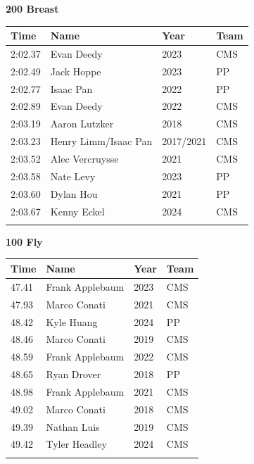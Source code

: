 \vspace{1.2em}
\noindent\begin{minipage}[t]{0.98\textwidth}
\centering
\textbf{\textcolor{teamprimary}{200 Breast}}\par
\vspace{0.5em}
\centering
\small
\renewcommand{\arraystretch}{1.0}
\setlength{\tabcolsep}{4pt}
\begin{tabular}{@{}p{2.5cm}p{4.5cm}p{1.5cm}p{2.5cm}@{}}
\toprule
\textbf{Time} & \textbf{Name} & \textbf{Year} & \textbf{Team} \\
\midrule
2:02.37 & Evan Deedy & 2023 & CMS \\
2:02.49 & Jack Hoppe & 2023 & PP \\
2:02.77 & Isaac Pan & 2022 & PP \\
2:02.89 & Evan Deedy & 2022 & CMS \\
2:03.19 & Aaron Lutzker & 2018 & CMS \\
2:03.23 & Henry Limm/Isaac Pan & 2017/2021 & CMS \\
2:03.52 & Alec Vercruysse & 2021 & CMS \\
2:03.58 & Nate Levy & 2023 & PP \\
2:03.60 & Dylan Hou & 2021 & PP \\
2:03.67 & Kenny Eckel & 2024 & CMS \\
\bottomrule
\vspace{0.5em}
\end{tabular}
\end{minipage}
\vspace{1.2em}
\noindent\begin{minipage}[t]{0.98\textwidth}
\centering
\textbf{\textcolor{teamprimary}{100 Fly}}\par
\vspace{0.5em}
\centering
\small
\renewcommand{\arraystretch}{1.0}
\setlength{\tabcolsep}{4pt}
\begin{tabular}{@{}p{2.5cm}p{4.5cm}p{1.5cm}p{2.5cm}@{}}
\toprule
\textbf{Time} & \textbf{Name} & \textbf{Year} & \textbf{Team} \\
\midrule
47.41 & Frank Applebaum & 2023 & CMS \\
47.93 & Marco Conati & 2021 & CMS \\
48.42 & Kyle Huang & 2024 & PP \\
48.46 & Marco Conati & 2019 & CMS \\
48.59 & Frank Applebaum & 2022 & CMS \\
48.65 & Ryan Drover & 2018 & PP \\
48.98 & Frank Applebaum & 2021 & CMS \\
49.02 & Marco Conati & 2018 & CMS \\
49.39 & Nathan Luis & 2019 & CMS \\
49.42 & Tyler Headley & 2024 & CMS \\
\bottomrule
\vspace{0.5em}
\end{tabular}
\end{minipage}
